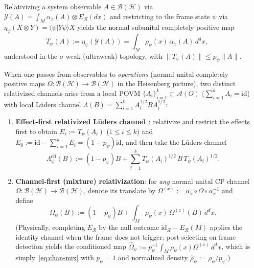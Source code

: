 \documentclass[11pt,a4paper]{article}
\theoremstyle{definition}
\theoremstyle{remark}
\newcommand{\HH}{\mathcal{H}}
\newcommand{\BB}{\mathcal{B}}
\newcommand{\Ac}{\mathcal{A}}
\newcommand{\Rf}{\mathscr{R}}
\newcommand{\id}{\mathrm{id}}
\newcommand{\Y}{\mathcal{Y}}
\newcommand{\braket}[2]{\langle #1 | #2 \rangle}
\newcommand{\norm}[1]{\|#1\|}
\begin{document}
Relativizing a system observable $A\in\BB(\HH)$ via $\Y(A) = \int_M \alpha_x(A)\otimes E_\Rf(dx)$ and restricting to the frame state $\psi$ via $\eta_\psi(X\otimes Y) = \braket{\psi}{Y\psi} X$ yields the normal subunital completely positive map
\begin{equation}\label{eq:Tpsi}
T_\psi(A) := \eta_\psi(\Y(A)) = \int_M \rho_\psi(x)\,\alpha_x(A)\,d^dx,
\end{equation}
understood in the $\sigma$-weak (ultraweak) topology, with $\norm{T_\psi(A)}\le p_\psi\norm{A}$.

When one passes from observables to \emph{operations} (normal unital completely positive maps $\Omega:\BB(\HH)\to\BB(\HH)$ in the Heisenberg picture), two distinct relativized channels arise from a local POVM $\{A_i\}_{i=1}^k\subset\Ac(O)$ ($\sum_{i=1}^k A_i = \id$) with local L\"uders channel $\Lambda(B) = \sum_{i=1}^k A_i^{1/2} B A_i^{1/2}$:
\begin{enumerate}[label=\textup{(\roman*)},leftmargin=*,nosep]
\item \textbf{Effect-first relativized L\"uders channel}~\cite[Cor.~4.7]{FewsterLoveridge2026}: relativize and restrict the effects first to obtain $E_i := T_\psi(A_i)$ ($1\le i\le k$) and $E_0 := \id - \sum_{i=1}^k E_i = (1-p_\psi)\id$, and then take the L\"uders channel
\begin{equation}\label{eq:luders-eff}
\Lambda_\psi^{\mathrm{eff}}(B) := (1-p_\psi)B + \sum_{i=1}^k T_\psi(A_i)^{1/2}\,B\,T_\psi(A_i)^{1/2}.
\end{equation}
\item \textbf{Channel-first (mixture) relativization}: for \emph{any} normal unital CP channel $\Omega:\BB(\HH)\to\BB(\HH)$, denote its translate by $\Omega^{(x)} := \alpha_x\circ\Omega\circ\alpha_x^{-1}$ and define
\begin{equation}\label{eq:chan-mix}
\Omega_\psi(B) := (1-p_\psi)B + \int_M \rho_\psi(x)\,\Omega^{(x)}(B)\,d^dx.
\end{equation}
(Physically, completing $E_\Rf$ by the null outcome $\id_\Rf - E_\Rf(M)$ applies the identity channel when the frame does not trigger; post-selecting on frame detection yields the conditioned map $\widehat{\Omega}_\psi := p_\psi^{-1}\int_M \rho_\psi(x)\Omega^{(x)}\,d^dx$, which is simply~\eqref{eq:chan-mix} with $p_\psi=1$ and normalized density $\hat{\rho}_\psi := \rho_\psi/p_\psi$.)
\end{enumerate}
\end{document}
